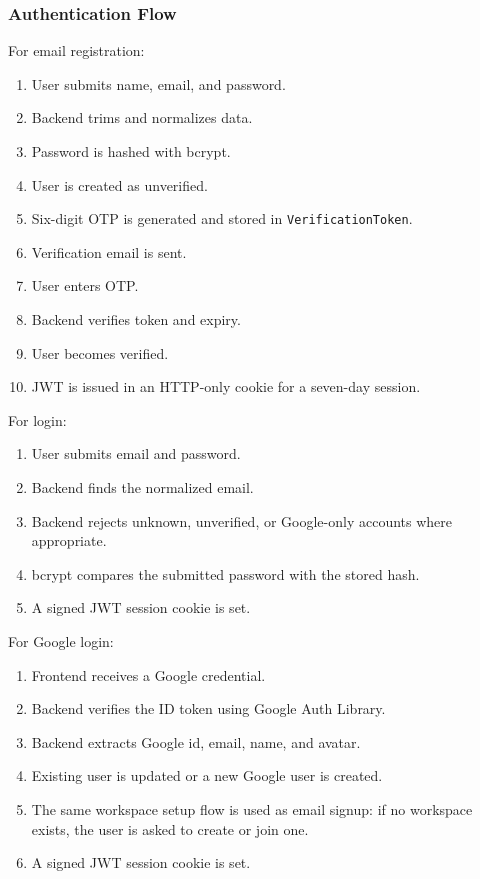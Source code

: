 \documentclass[
]{article}
\providecommand{\tightlist}{%
  \setlength{\itemsep}{0pt}\setlength{\parskip}{0pt}}
\begin{document}
\subsubsection{Authentication Flow}\label{authentication-flow}

For email registration:

\begin{enumerate}
\def\labelenumi{\arabic{enumi}.}
\tightlist
\item
  User submits name, email, and password.
\item
  Backend trims and normalizes data.
\item
  Password is hashed with bcrypt.
\item
  User is created as unverified.
\item
  Six-digit OTP is generated and stored in \texttt{VerificationToken}.
\item
  Verification email is sent.
\item
  User enters OTP.
\item
  Backend verifies token and expiry.
\item
  User becomes verified.
\item
  JWT is issued in an HTTP-only cookie for a seven-day session.
\end{enumerate}

For login:

\begin{enumerate}
\def\labelenumi{\arabic{enumi}.}
\tightlist
\item
  User submits email and password.
\item
  Backend finds the normalized email.
\item
  Backend rejects unknown, unverified, or Google-only accounts where
  appropriate.
\item
  bcrypt compares the submitted password with the stored hash.
\item
  A signed JWT session cookie is set.
\end{enumerate}

For Google login:

\begin{enumerate}
\def\labelenumi{\arabic{enumi}.}
\tightlist
\item
  Frontend receives a Google credential.
\item
  Backend verifies the ID token using Google Auth Library.
\item
  Backend extracts Google id, email, name, and avatar.
\item
  Existing user is updated or a new Google user is created.
\item
  The same workspace setup flow is used as email signup: if no workspace
  exists, the user is asked to create or join one.
\item
  A signed JWT session cookie is set.
\end{enumerate}
\end{document}
